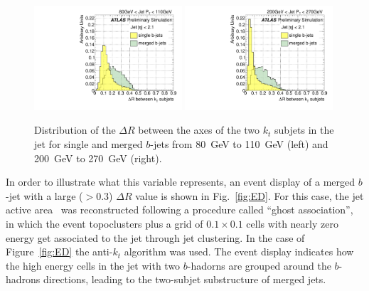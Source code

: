 \begin{figure}[tp]
\centering
\includegraphics[width=0.49\textwidth]{FIGS/VarsSingleMerged/DRkt2axes080.pdf}
\includegraphics[width=0.49\textwidth]{FIGS/VarsSingleMerged/DRkt2axes200.pdf}
\caption{Distribution of the $\Delta R$ between the axes of the two $k_t$ subjets in the jet for single and merged $b$-jets from 80~GeV to 110~GeV (left) and 200~GeV to 270~GeV (right).}
\label{fig:drktsinglemerged}
\end{figure}

In order to illustrate what this variable represents, an event display of a merged $b$-jet with a large  ($>0.3$) $\Delta R$  %
value is shown in Fig.~\ref{fig:ED}.  For this case, the jet active area~\cite{CatchmentArea} was reconstructed following a procedure called ``ghost association'', in which the event topoclusters plus a grid of $0.1 \times 0.1$ cells  with nearly zero energy get associated to the jet through jet clustering. In the case of Figure~\ref{fig:ED} the anti-$k_t$ algorithm was used.  The event display indicates how the high energy cells in the jet with two $b$-hadorns are grouped around the $b$-hadrons directions, leading to the two-subjet substructure of merged jets.

